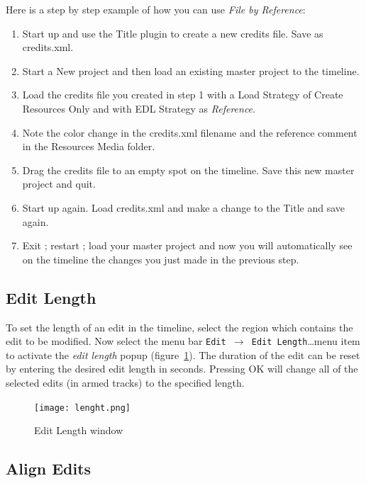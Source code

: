 Here is a step by step example of how you can use \textit{File by
  Reference}:
\begin{enumerate}
\item Start up \CGG{} and use the Title plugin to create a new
  credits file.  Save as credits.xml.
\item Start a New project and then load an existing master
  project to the timeline.
\item Load the credits file you created in step 1 with a Load
  Strategy of Create Resources Only and with EDL Strategy as
  \textit{Reference}.
\item Note the color change in the credits.xml filename and the
  reference comment in the Resources Media folder.
\item Drag the credits file to an empty spot on the timeline.
  Save this new master project and quit.
\item Start \CGG{} up again.  Load credits.xml and make a change
  to the Title and save again.
\item Exit \CGG{}; restart \CGG{}; load your master project and
  now you will automatically see on the timeline the changes you just
  made in the previous step.
\end{enumerate}


\subsection{Edit Length}%
\label{sub:edit-lenght}

To set the length of an edit in the timeline, select the region
which contains the edit to be modified. Now select the menu bar
\texttt{Edit $\rightarrow$ Edit Length}\dots menu item to activate
the \textit{edit length} popup (figure~\ref{fig:lenght}).  The
duration of the edit can be reset by entering the desired edit
length in seconds.  Pressing OK will change all of the selected
edits (in armed tracks) to the specified length.

\begin{figure}[htpb]
    \centering
    \texttt{[image: lenght.png]}
    \caption{Edit Length window}
    \label{fig:lenght}
\end{figure}

\subsection{Align Edits}%
\label{sub:align_edits}

